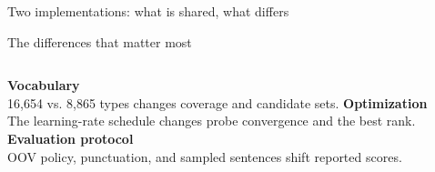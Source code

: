 \documentclass[aspectratio=169,9pt,t]{beamer}
\begin{document}
\begin{frame}{Two implementations: what is shared, what differs}
\begin{alertblock}{The differences that matter most}
\begin{columns}[T,onlytextwidth]
\textbf{Vocabulary}\\[-1pt]{\scriptsize 16,654 vs. 8,865 types changes coverage and candidate sets.}
\textbf{Optimization}\\[-1pt]{\scriptsize The learning-rate schedule changes probe convergence and the best rank.}
\textbf{Evaluation protocol}\\[-1pt]{\scriptsize OOV policy, punctuation, and sampled sentences shift reported scores.}
\end{columns}
\end{alertblock}
\end{frame}

\end{document}
